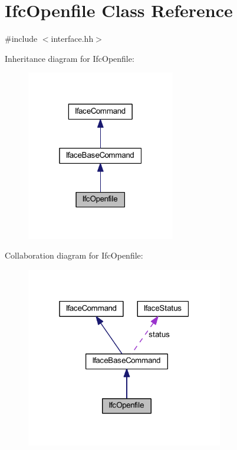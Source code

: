 \hypertarget{class_ifc_openfile}{}\section{Ifc\+Openfile Class Reference}
\label{class_ifc_openfile}


{\ttfamily \#include $<$interface.\+hh$>$}



Inheritance diagram for Ifc\+Openfile\+:
\nopagebreak
\begin{figure}[H]
\begin{center}
\leavevmode
\includegraphics[width=184pt]{class_ifc_openfile__inherit__graph}
\end{center}
\end{figure}


Collaboration diagram for Ifc\+Openfile\+:
\nopagebreak
\begin{figure}[H]
\begin{center}
\leavevmode
\includegraphics[width=244pt]{class_ifc_openfile__coll__graph}
\end{center}
\end{figure}
